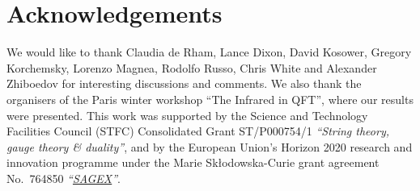 \documentclass[a4paper,11pt]{article}
\numberwithin{equation}{section}
\begin{document}
\section*{Acknowledgements}

We would like to thank  Claudia de Rham, Lance Dixon, David Kosower, Gregory Korchemsky, Lorenzo Magnea, Rodolfo Russo,  Chris White and Alexander Zhiboedov for   interesting  discussions and comments. We also thank the organisers of the Paris winter workshop ``The Infrared in QFT'', where our results were presented. This work  was supported by the Science and Technology Facilities Council (STFC) Consolidated Grant ST/P000754/1 \textit{``String theory, gauge theory \& duality''}, and by the European Union's Horizon 2020 research and innovation programme under the Marie Sk\l{}odowska-Curie grant agreement No.~764850 {\it ``\href{https://sagex.org}{SAGEX}''}.




\appendix



\end{document}
